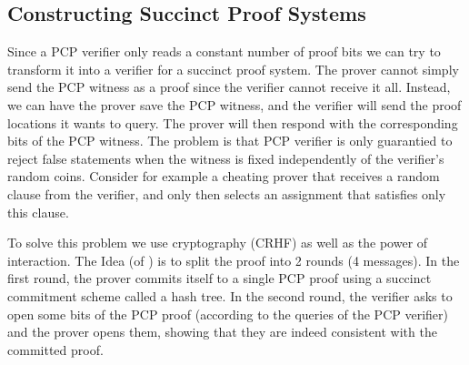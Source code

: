 \documentclass{article}
\begin{document}
\subsection{Constructing Succinct Proof Systems}
Since a PCP verifier only reads a constant number of proof bits we can try to transform it into a verifier for a succinct proof system. The prover cannot simply send the PCP witness as a proof since the verifier cannot receive it all. Instead, we can have the prover save the PCP witness, and the verifier will send the proof locations it wants to query. The prover will then respond with the corresponding bits of the PCP witness. The problem is that PCP verifier is only guarantied to reject false statements when the witness is fixed independently of the verifier's random coins. Consider for example a cheating prover that receives a random clause from the verifier, and only then selects an assignment that satisfies only this clause.

To solve this problem we use cryptography (CRHF) as well as the power of interaction. The Idea (of \cite{Kilian92}) is to split the proof into 2 rounds (4 messages). In the first round, the prover commits itself to a single PCP proof using a succinct commitment scheme called a hash tree. In the second round, the verifier asks to open some bits of the PCP proof (according to the queries of the PCP verifier) and the prover opens them, showing that they are indeed consistent with the committed proof.
\end{document}
